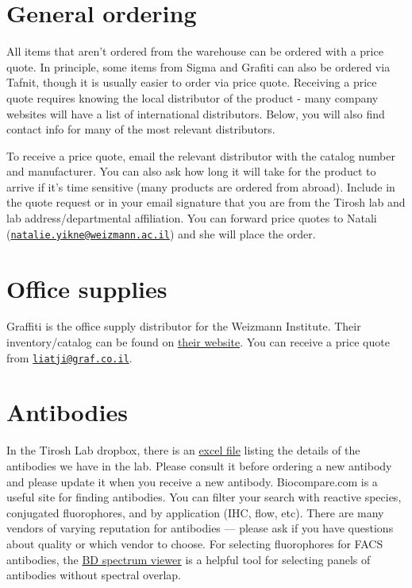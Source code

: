\documentclass[
]{book}
\begin{document}
\hypertarget{general-ordering}{%
\section{General ordering}\label{general-ordering}}

All items that aren't ordered from the warehouse can be ordered with a price quote. In principle, some items from Sigma and Grafiti can also be ordered via Tafnit, though it is usually easier to order via price quote. Receiving a price quote requires knowing the local distributor of the product - many company websites will have a list of international distributors. Below, you will also find contact info for many of the most relevant distributors.

To receive a price quote, email the relevant distributor with the catalog number and manufacturer. You can also ask how long it will take for the product to arrive if it's time sensitive (many products are ordered from abroad). Include in the quote request or in your email signature that you are from the Tirosh lab and lab address/departmental affiliation. You can forward price quotes to Natali (\href{mailto:natalie.yikne@weizmann.ac.il}{\nolinkurl{natalie.yikne@weizmann.ac.il}}) and she will place the order.

\hypertarget{office-supplies}{%
\section{Office supplies}\label{office-supplies}}

Graffiti is the office supply distributor for the Weizmann Institute. Their inventory/catalog can be found on \href{https://www.graffiti-online.co.il/}{their website}. You can receive a price quote from \href{mailto:liatji@graf.co.il}{\nolinkurl{liatji@graf.co.il}}.

\hypertarget{antibodies}{%
\section{Antibodies}\label{antibodies}}

In the Tirosh Lab dropbox, there is an \href{https://www.dropbox.com/s/8fr2p795g5zgepz/antibodies_Tirosh.xlsx?dl=0}{excel file} listing the details of the antibodies we have in the lab. Please consult it before ordering a new antibody and please update it when you receive a new antibody. Biocompare.com is a useful site for finding antibodies. You can filter your search with reactive species, conjugated fluorophores, and by application (IHC, flow, etc). There are many vendors of varying reputation for antibodies --- please ask if you have questions about quality or which vendor to choose. For selecting fluorophores for FACS antibodies, the \href{https://www.bdbiosciences.com/en-us/applications/research-applications/multicolor-flow-cytometry/product-selection-tools/spectrum-viewer}{BD spectrum viewer} is a helpful tool for selecting panels of antibodies without spectral overlap.
\end{document}
